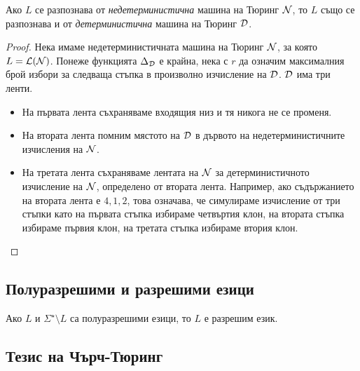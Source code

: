 \begin{framed}
  \begin{thm}
    Ако $L$ се разпознава от {\em недетерминистична} машина на Тюринг $\mathcal{N}$, то $L$
    също се разпознава и от {\em детерминистична} машина на Тюринг $\mathcal{D}$.
  \end{thm}
\end{framed}
\begin{proof}
  Нека имаме недетерминистичната машина на Тюринг $\mathcal{N}$, за която $L = \mathcal{L}(\mathcal{N})$.
  Понеже функцията $\Delta_{\mathcal{D}}$ е крайна, нека с $r$ да означим 
  максималния брой избори за следваща стъпка в произволно изчисление на $\mathcal{D}$.
  $\mathcal{D}$ има три ленти.
  \begin{itemize}
  \item 
    На първата лента съхраняваме входящия низ и тя никога не се променя.
  \item
    На втората лента помним мястото на $\mathcal{D}$ в дървото на недетерминистичните изчисления на $\mathcal{N}$.  
  \item
    На третата лента съхраняваме лентата на $\mathcal{N}$ за детерминистичното изчисление на $\mathcal{N}$, 
    определено от втората лента. Например, ако съдържанието на втората лента е $4,1,2$,
    това означава, че симулираме изчисление от три стъпки като на първата стъпка избираме четвъртия
    клон, на втората стъпка избираме първия клон, на третата стъпка избираме втория клон.
  \end{itemize}
\end{proof}


\subsection*{Полуразрешими и разрешими езици}

\begin{framed}
\begin{thm}[Пост]
  Ако $L$ и $\Sigma^\star \setminus L$ са полуразрешими езици, то $L$ е разрешим език.
\end{thm}
\end{framed}




\subsection*{Тезис на Чърч-Тюринг}

